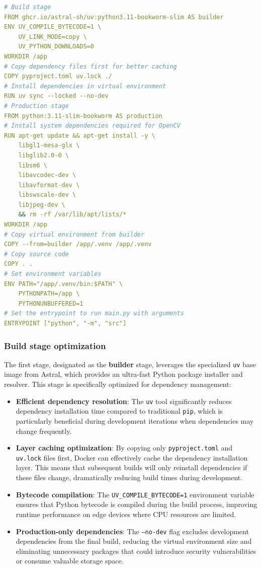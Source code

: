 \begin{lstlisting}[language=yaml, caption={Multi-stage Docker build configuration for edge deployment}]
# Build stage
FROM ghcr.io/astral-sh/uv:python3.11-bookworm-slim AS builder
ENV UV_COMPILE_BYTECODE=1 \
    UV_LINK_MODE=copy \
    UV_PYTHON_DOWNLOADS=0
WORKDIR /app
# Copy dependency files first for better caching
COPY pyproject.toml uv.lock ./
# Install dependencies in virtual environment
RUN uv sync --locked --no-dev
# Production stage
FROM python:3.11-slim-bookworm AS production
# Install system dependencies required for OpenCV
RUN apt-get update && apt-get install -y \
    libgl1-mesa-glx \
    libglib2.0-0 \
    libsm6 \
    libavcodec-dev \
    libavformat-dev \
    libswscale-dev \
    libjpeg-dev \
    && rm -rf /var/lib/apt/lists/*
WORKDIR /app
# Copy virtual environment from builder
COPY --from=builder /app/.venv /app/.venv
# Copy source code
COPY . .
# Set environment variables
ENV PATH="/app/.venv/bin:$PATH" \
    PYTHONPATH=/app \
    PYTHONUNBUFFERED=1
# Set the entrypoint to run main.py with arguments
ENTRYPOINT ["python", "-m", "src"]
\end{lstlisting}

\subsubsection{Build stage optimization}

The first stage, designated as the \textbf{builder} stage, leverages the specialized \texttt{uv} base image from Astral, which provides an ultra-fast Python package installer and resolver. This stage is specifically optimized for dependency management:

\begin{itemize}
    \item \textbf{Efficient dependency resolution}: The \texttt{uv} tool significantly reduces dependency installation time compared to traditional \texttt{pip}, which is particularly beneficial during development iterations when dependencies may change frequently.
    
    \item \textbf{Layer caching optimization}: By copying only \texttt{pyproject.toml} and \texttt{uv.lock} files first, Docker can effectively cache the dependency installation layer. This means that subsequent builds will only reinstall dependencies if these files change, dramatically reducing build times during development.
    
    \item \textbf{Bytecode compilation}: The \texttt{UV\_COMPILE\_BYTECODE=1} environment variable ensures that Python bytecode is compiled during the build process, improving runtime performance on edge devices where CPU resources are limited.
    
    \item \textbf{Production-only dependencies}: The \texttt{--no-dev} flag excludes development dependencies from the final build, reducing the virtual environment size and eliminating unnecessary packages that could introduce security vulnerabilities or consume valuable storage space.
\end{itemize}


